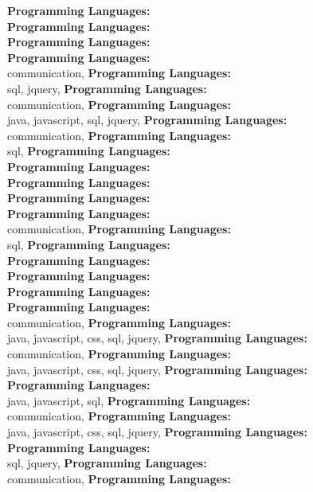 \textbf{Programming Languages:} \\
\textbf{Programming Languages:} \\
\textbf{Programming Languages:} \\
\textbf{Programming Languages:} \\
communication, \textbf{Programming Languages:} \\
sql, jquery, \textbf{Programming Languages:} \\
communication, \textbf{Programming Languages:} \\
java, javascript, sql, jquery, \textbf{Programming Languages:} \\
communication, \textbf{Programming Languages:} \\
sql, \textbf{Programming Languages:} \\
\textbf{Programming Languages:} \\
\textbf{Programming Languages:} \\
\textbf{Programming Languages:} \\
\textbf{Programming Languages:} \\
communication, \textbf{Programming Languages:} \\
sql, \textbf{Programming Languages:} \\
\textbf{Programming Languages:} \\
\textbf{Programming Languages:} \\
\textbf{Programming Languages:} \\
\textbf{Programming Languages:} \\
communication, \textbf{Programming Languages:} \\
java, javascript, css, sql, jquery, \textbf{Programming Languages:} \\
communication, \textbf{Programming Languages:} \\
java, javascript, css, sql, jquery, \textbf{Programming Languages:} \\
\textbf{Programming Languages:} \\
java, javascript, sql, \textbf{Programming Languages:} \\
communication, \textbf{Programming Languages:} \\
java, javascript, css, sql, jquery, \textbf{Programming Languages:} \\
\textbf{Programming Languages:} \\
sql, jquery, \textbf{Programming Languages:} \\
communication, \textbf{Programming Languages:} \\

